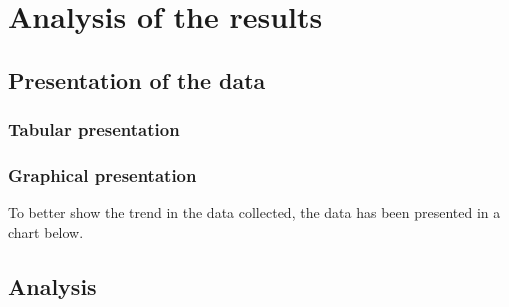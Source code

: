 \section{Analysis of the results}

\subsection{Presentation of the data}

\subsubsection{Tabular presentation}

\subsubsection{Graphical presentation}

To better show the trend in the data collected, the data 
has been presented in a chart below. 

\subsection{Analysis}

